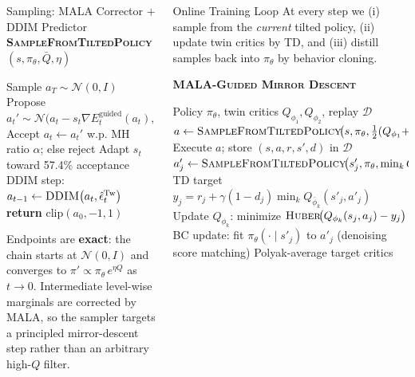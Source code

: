 \documentclass[final,hyperref={pdfpagelabels=false}]{beamer}
\newcommand{\algtitle}[1]{\smallskip\noindent\textbf{\textsc{#1}}\smallskip}
\newlength{\colwidth}
\begin{document}
\begin{frame}[t]
\begin{columns}[t]
\begin{column}{\colwidth}
\vspace{1cm}

\begin{block}{\Large Sampling: MALA Corrector $+$ DDIM Predictor}
\algtitle{SampleFromTiltedPolicy$(s,\pi_\theta,\bar Q,\eta)$}
\vspace{-0.3em}
\begin{algorithmic}[1]
\STATE Sample $a_T\sim\mathcal{N}(0,I)$
    \STATE Propose $a_t' \sim \mathcal{N}\!\bigl(a_t - s_t\nabla E_t^{\mathrm{guided}}(a_t),\;2s_tI\bigr)$
    \STATE Accept $a_t \leftarrow a_t'$ w.p. MH ratio $\alpha$; else reject
    \STATE Adapt $s_t$ toward 57.4\% acceptance
  \ENDFOR
  \STATE DDIM step: $a_{t-1} \leftarrow \textsc{DDIM}\bigl(a_t,\hat\epsilon_t^{\mathrm{Tw}}\bigr)$
\ENDFOR
\STATE \textbf{return} $\mathrm{clip}(a_0,-1,1)$
\end{algorithmic}

\vspace{0.4em}
Endpoints are \textbf{exact}: the chain starts at $\mathcal{N}(0,I)$ and converges to $\pi'\propto\pi_\theta\,e^{\eta Q}$ as $t\to 0$. Intermediate level-wise marginals are corrected by MALA, so the sampler targets a principled mirror-descent step rather than an arbitrary high-$Q$ filter.
\end{block}

\end{column}

\begin{column}{\colwidth}

\begin{block}{\Large Online Training Loop}
At every step we (i) sample from the \emph{current} tilted policy, (ii) update twin critics by TD, and (iii) distill samples back into $\pi_\theta$ by behavior cloning.

\algtitle{MALA-Guided Mirror Descent}
\vspace{-0.5em}
\begin{algorithmic}[1]
\REQUIRE Policy $\pi_\theta$, twin critics $Q_{\phi_1},Q_{\phi_2}$, replay $\mathcal{D}$
  \STATE $a \leftarrow \textsc{SampleFromTiltedPolicy}\!\bigl(s,\pi_\theta,\tfrac{1}{2}(Q_{\phi_1}{+}Q_{\phi_2}),\eta\bigr)$
  \STATE Execute $a$; store $(s,a,r,s',d)$ in $\mathcal{D}$
  \STATE $a'_j \leftarrow \textsc{SampleFromTiltedPolicy}\!\bigl(s'_j,\pi_\theta,\min_k Q_{\phi_k},\eta\bigr)$
  \STATE TD target $y_j = r_j+\gamma(1{-}d_j)\min_k Q_{\bar\phi_k}(s'_j,a'_j)$
  \STATE Update $Q_{\phi_k}$: minimize $\textsc{Huber}\!\bigl(Q_{\phi_k}(s_j,a_j)-y_j\bigr)$
  \STATE BC update: fit $\pi_\theta(\cdot\mid s'_j)$ to $a'_j$ (denoising score matching)
  \STATE Polyak-average target critics
\ENDFOR
\end{algorithmic}


\end{block}
\end{column}
\end{columns}
\end{frame}
\end{document}
